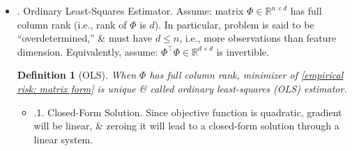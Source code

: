 \documentclass{article}
\newtheorem{definition}{Definition}
\begin{document}
\begin{enumerate}
\begin{itemize}
\begin{itemize}
			{\bf Matrix notation.} Cost function \eqref{empirical risk} can be rewritten in matrix notation. Let $y = (y_1,\ldots,y_n)^\top\in\mathbb{R}^n$: vector of outputs (sometimes called {\it response vector}), \& $\Phi\in\mathbb{R}^{n\times n}$: matrix of inputs, whose rows are $\varphi(x_i)^\top$, called {\it design matrix} or {\it data matrix}. In this notation, empirical risk is:
			\begin{equation}
				\label{empirical risk: matrix form}
				\widehat{\cal R}(\theta) = \frac{1}{n}\|y - \Phi\theta\|_2^2,
			\end{equation}
			where $\|\alpha\|_2^2 = \sum_{j=1}^d \alpha_j^2$: squared $l_2$-norm of $\alpha$.
			
			Sometimes tempting at 1st to avoid matrix notation. Strongly advise against it, as it leads to lengthy \& error-prone formulas.
			\item {. Ordinary Least-Squares Estimator.} Assume: matrix $\Phi\in\mathbb{R}^{n\times d}$ has full column rank (i.e., rank of $\Phi$ is $d$). In particular, problem is said to be ``overdetermined,'' \& must have $d\le n$, i.e., more observations than feature dimension. Equivalently, assume: $\Phi^\top\Phi\in\mathbb{R}^{d\times d}$ is invertible.
			
			\begin{definition}[OLS]
				When $\Phi$ has full column rank, minimizer of \eqref{empirical risk: matrix form} is unique \& called {\rm ordinary least-squares (OLS) estimator}.
			\end{definition}
			
			\begin{itemize}
				\item {.1. Closed-Form Solution.} Since objective function is quadratic, gradient will be linear, \& zeroing it will lead to a closed-form solution through a linear system.
				

\end{itemize}
\end{itemize}
\end{itemize}
\end{enumerate}
\end{document}
